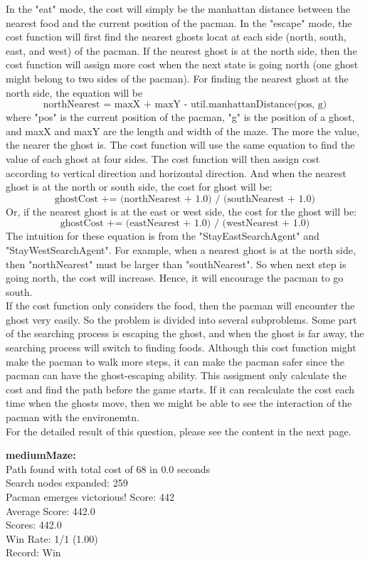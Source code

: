 \documentclass[11pt]{article}
\begin{document}
\noindent
In the "eat" mode, the cost will simply be the manhattan distance between the nearest food and the current position of the pacman. In the "escape" mode, the cost function will first find the nearest ghosts locat at each side (north, south, east, and west) of the pacman. If the nearest ghost is at the north side, then the cost function will assign more cost when the next state is going north (one ghost might belong to two sides of the pacman). For finding the nearest ghost at the north side, the equation will be 
$$\text{northNearest = maxX + maxY - util.manhattanDistance(pos, g)}$$
where "pos" is the current position of the pacman, "g" is the position of a ghost, and maxX and maxY are the length and width of the maze. The more the value, the nearer the ghost is. The cost function will use the same equation to find the value of each ghost at four sides. The cost function will then assign cost according to vertical direction and horizontal direction. And when the nearest ghost is at the north or south side, the cost for ghost will be:
$$\text{ghostCost += (northNearest + 1.0) / (southNearest + 1.0)}$$
Or, if the nearest ghost is at the east or west side, the cost for the ghost will be:
$$\text{ghostCost += (eastNearest + 1.0) / (westNearest + 1.0)}$$
The intuition for these equation is from the "StayEastSearchAgent" and "StayWestSearchAgent". For example, when a nearest ghost is at the north side, then "northNearest" must be larger than "southNearest". So when next step is going north, the cost will increase. Hence, it will encourage the pacman to go south.\\

\noindent
If the cost function only considers the food, then the pacman will encounter the ghost very easily. So the problem is divided into several subproblems. Some part of the searching process is escaping the ghost, and when the ghost is far away, the searching process will switch to finding foods. Although this cost function might make the pacman to walk more steps, it can make the pacman safer since the pacman can have the ghost-escaping ability. This assigment only calculate the cost and find the path before the game starts. If it can recalculate the cost each time when the ghosts move, then we might be able to see the interaction of the pacman with the environemtn.\\

\noindent
For the detailed result of this question, please see the content in the next page.

\newpage
\noindent
\textbf{mediumMaze:}\\
Path found with total cost of 68 in 0.0 seconds\\
Search nodes expanded: 259\\
Pacman emerges victorious! Score: 442\\
Average Score: 442.0\\
Scores:        442.0\\
Win Rate:      1/1 (1.00)\\
Record:        Win\\
\end{document}
